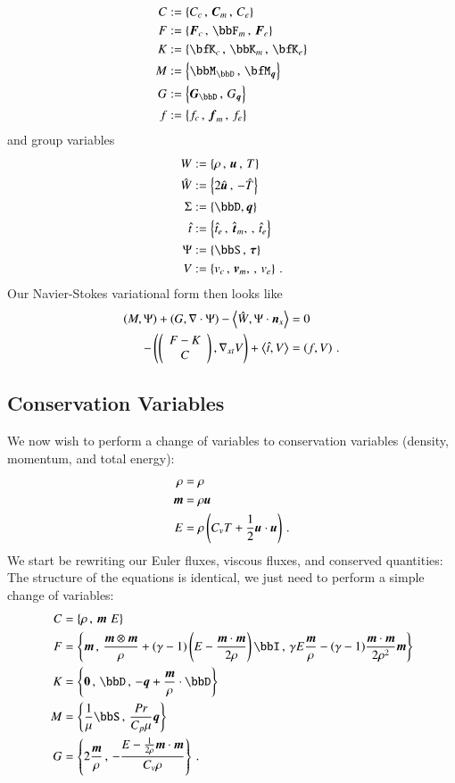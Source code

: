 \documentclass[preprint,12pt]{elsarticle}
\begin{document}
\begin{align*}
C&:=\LRc{C_c\,,\, \bfC_m\,,\, C_e}\\
F&:=\LRc{\bfF_c\,,\, \bbF_m\,,\, \bfF_e}\\
K&:=\LRc{\bfK_c\,,\, \bbK_m\,,\, \bfK_e}\\
M&:=\LRc{\bbM_{\bbD}\,,\, \bfM_{\bfq}}\\
G&:=\LRc{\bfG_{\bbD}\,,\, G_{\bfq}}\\
f&:=\LRc{f_c\,,\, \bff_m\,,\, f_e}\\
\end{align*}
and group variables
\begin{align*}
W&:=\LRc{\rho\,,\,\bfu\,,\,T}\\
\hat W&:=\LRc{2\hat\bfu\,,\,-\hat T}\\
\Sigma&:=\LRc{\bbD,\bfq}\\
\hat t&:=\LRc{\hat t_e\,,\,\hat\bft_m,\,,\,\hat t_e}\\
\Psi&:=\LRc{\bbS\,,\,\bftau}\\
V&:=\LRc{v_c\,,\,\bfv_m,\,,\,v_e}\,.
\end{align*}
Our Navier-Stokes variational form then looks like
\begin{subequations}
\label{eq:shortFormNL}
\begin{align}
\left( M,\Psi \right)+\left( G,\nabla\cdot\Psi \right)-\left\langle \hat W,\Psi\cdot\boldsymbol n_x \right\rangle&=0\\
-\left( \left( \begin{array}{c} F-K\\ C\\ \end{array} \right),\nabla_{xt} V \right)+\left\langle \hat t,V \right\rangle&=\left( f,V \right)\,.
\end{align}
\end{subequations}

\subsection{Conservation Variables}
We now wish to perform a change of variables to conservation variables (density, momentum, and total energy):
\begin{align*}
\rho&=\rho\\
\boldsymbol m&=\rho\boldsymbol u\\
E&=\rho\left( C_v T+\frac{1}{2}\boldsymbol u\cdot\boldsymbol u \right)\,.
\end{align*}
We start be rewriting our Euler fluxes, viscous fluxes, and conserved quantities:
The structure of the equations is identical, we just need to perform a simple change of variables:
\begin{align*}
C&=\LRc{\rho\,,\,
\bfm\,\,
E}\\
F&=\LRc{\bfm\,,\,
\frac{\bfm\otimes\bfm}{\rho}+(\gamma-1)\LRp{E-\frac{\bfm\cdot\bfm}{2\rho}}\bbI\,,\,
\gamma E\frac{\bfm}{\rho}-(\gamma-1)\frac{\bfm\cdot\bfm}{2\rho^2}\bfm}\\
K&=\LRc{\boldsymbol 0\,,\,
\bbD\,,\,
-\bfq+\frac{\bfm}{\rho}\cdot\bbD}\\
M&=\LRc{\frac{1}{\mu}\bbS\,,\,
\frac{Pr}{C_p\mu}\bfq}\\
G&=\LRc{2\frac{\bfm}{\rho}\,,\,
-\frac{E-\frac{1}{2\rho}\bfm\cdot\bfm}{C_v\rho}}\,.
\end{align*}
\end{document}
